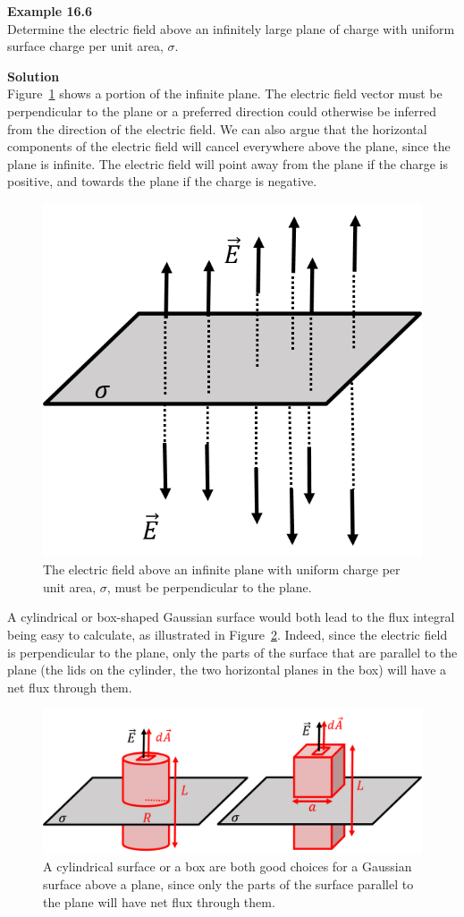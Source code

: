 \begin{framed}
\textbf{Example 16.6}\\
Determine the electric field above an infinitely large plane of charge with uniform surface charge per unit area, $\sigma$.

\begin{framed}
\textbf{Solution}\\
Figure~\ref{fig:gauss:plane} shows a portion of the infinite plane. The electric field vector must be perpendicular to the plane or a preferred direction could otherwise be inferred from the direction of the electric field. We can also argue that the horizontal components of the electric field will cancel everywhere above the plane, since the plane is infinite. The electric field will point away from the plane if the charge is positive, and towards the plane if the charge is negative.

\begin{figure}[!htbp]
\centering
\includegraphics[width=0.4\linewidth]{files/plane-d0a96e90ca3e3d639d338b307ecccab8.png}
\caption[]{The electric field above an infinite plane with uniform charge per unit area, $\sigma$, must be perpendicular to the plane.}
\label{fig:gauss:plane}
\end{figure}

A cylindrical or box-shaped Gaussian surface would both lead to the flux integral being easy to calculate, as illustrated in Figure~\ref{fig:gauss:fluxplane}. Indeed, since the electric field is perpendicular to the plane, only the parts of the surface that are parallel to the plane (the lids on the cylinder, the two horizontal planes in the box) will have a net flux through them.

\begin{figure}[!htbp]
\centering
\includegraphics[width=0.8\linewidth]{files/fluxplane-699ae1b062d45554f05fd11d04c847bd.png}
\caption[]{A cylindrical surface or a box are both good choices for a Gaussian surface above a plane, since only the parts of the surface parallel to the plane will have net flux through them.}
\label{fig:gauss:fluxplane}
\end{figure}


\end{framed}
\end{framed}
